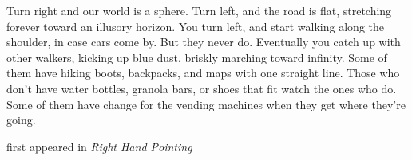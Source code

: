 Turn right and our world is a sphere. Turn left, and the road is flat,
stretching forever toward an illusory horizon. You turn left, and start
walking along the shoulder, in case cars come by. But they never do.
Eventually you catch up with other walkers, kicking up blue dust,
briskly marching toward infinity. Some of them have hiking boots,
backpacks, and maps with one straight line. Those who don't have water
bottles, granola bars, or shoes that fit watch the ones who do. Some of
them have change for the vending machines when they get where they're
going.

first appeared in \emph{Right Hand Pointing}

